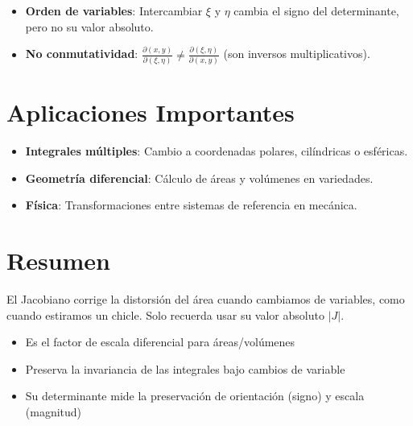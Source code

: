 \documentclass{article}
\begin{document}
\begin{minipage}{\dimexpr\textwidth-2\fboxsep}
\begin{itemize}
\item \textbf{Orden de variables}: Intercambiar $\xi$ y $\eta$ cambia el signo del determinante, pero no su valor absoluto.
\item \textbf{No conmutatividad}: $\frac{\partial(x,y)}{\partial(\xi,\eta)} \neq \frac{\partial(\xi,\eta)}{\partial(x,y)}$ (son inversos multiplicativos).
\end{itemize}
\end{minipage}

\section{Aplicaciones Importantes}
\begin{minipage}{\dimexpr\textwidth-2\fboxsep}
\begin{itemize}
\item \textbf{Integrales múltiples}: Cambio a coordenadas polares, cilíndricas o esféricas.
\item \textbf{Geometría diferencial}: Cálculo de áreas y volúmenes en variedades.
\item \textbf{Física}: Transformaciones entre sistemas de referencia en mecánica.
\end{itemize}
\end{minipage}

\section{Resumen}

\begin{center}
  \begin{minipage}{0.9\textwidth}
    El Jacobiano corrige la distorsión del área cuando cambiamos de variables, como cuando estiramos un chicle. Solo recuerda usar su valor absoluto $|J|$.

    \vspace{5pt}

    \begin{itemize}
      \item Es el factor de escala diferencial para áreas/volúmenes
      \item Preserva la invariancia de las integrales bajo cambios de variable
      \item Su determinante mide la preservación de orientación (signo) y escala (magnitud)
    \end{itemize}
  \end{minipage}
\end{center}
\end{document}

